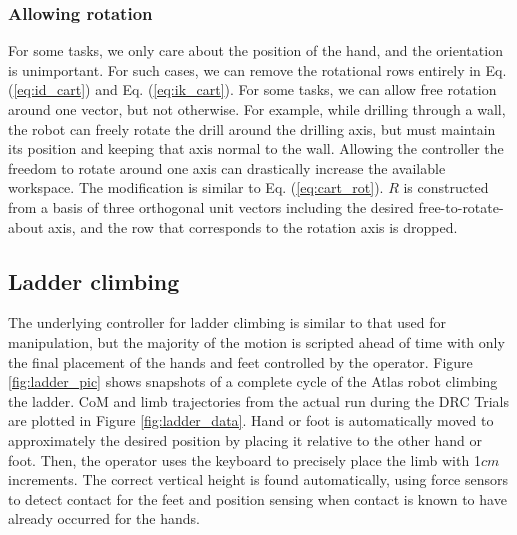 \documentclass{ws-ijhr}
\newcommand{\eref}[1] {Eq. (\ref{#1})}
\newcommand{\fref}[1] {Figure \ref{#1}}
\begin{document}
\subsubsection{Allowing rotation}
For some tasks, we only care about the position of the hand, and the 
orientation is unimportant. For such cases, we can remove the rotational
rows entirely in \eref{eq:id_cart} and \eref{eq:ik_cart}. For some tasks, we can allow free rotation around one 
vector, but not otherwise. For example, while drilling through a wall, the 
robot can freely rotate the drill around the drilling axis, but must 
maintain its position and keeping that axis normal to the wall. Allowing 
the controller the freedom to rotate around one axis can drastically 
increase the available workspace. The modification is similar to
\eref{eq:cart_rot}. $R$ is constructed from a basis of three orthogonal 
unit vectors including the desired free-to-rotate-about axis, and the row 
that corresponds to the rotation axis is dropped. 

\subsection{Ladder climbing}
The underlying controller for ladder climbing is similar to that used for 
manipulation, but the majority of the motion is scripted ahead of time with 
only the final placement of the hands and feet controlled by the operator. 
\fref{fig:ladder_pic} shows snapshots of a complete cycle of the Atlas robot
climbing the ladder. 
CoM and limb trajectories from the actual run during the DRC Trials are plotted 
in \fref{fig:ladder_data}. 
Hand or foot is automatically moved to approximately the 
desired position by placing it relative to the other hand or foot. Then, 
the operator uses the keyboard to precisely place the limb with 1$cm$ 
increments. The correct vertical height is found automatically, using force 
sensors to detect contact for the feet and position sensing when contact is 
known to have already occurred for the hands.
\end{document}
